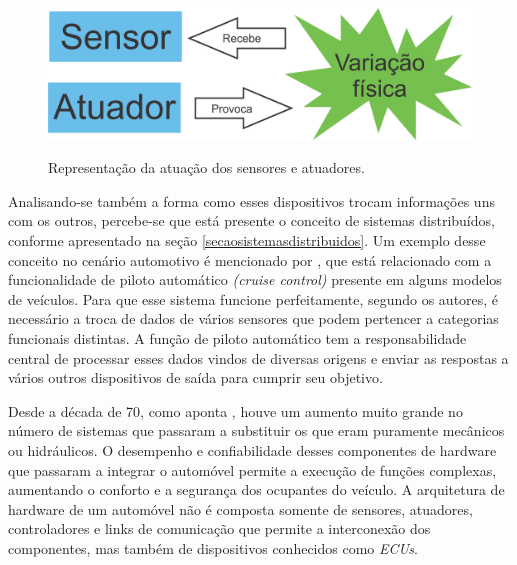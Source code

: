 \begin{figure}[!ht]
\centering
\caption{Representação da atuação dos sensores e atuadores.} 
{\includegraphics[scale=.29]{imagens/relacaoSensorAtuador.png}}\\
 \label{Fig:relacao_sensor_atuador}
\end{figure}

Analisando-se também a forma como esses dispositivos trocam informações uns com os outros, percebe-se que está presente o conceito de sistemas distribuídos, conforme apresentado na seção \ref{secaosistemasdistribuidos}. Um exemplo desse conceito no cenário automotivo é mencionado por , que está relacionado com a funcionalidade de piloto automático \textit{(cruise control)} presente em alguns modelos de veículos. Para que esse sistema funcione perfeitamente, segundo os autores, é necessário a troca de dados de vários sensores que podem pertencer a categorias funcionais distintas. A função de piloto automático tem a responsabilidade central de processar esses dados vindos de diversas origens e enviar as respostas a vários outros dispositivos de saída para cumprir seu objetivo.

Desde a década de 70, como aponta , houve um aumento muito grande no número de sistemas que passaram a substituir os que eram puramente mecânicos ou hidráulicos. O desempenho e confiabilidade desses componentes de hardware que passaram a integrar o automóvel permite a execução de funções complexas, aumentando o conforto e a segurança dos ocupantes do veículo. A arquitetura de hardware de um automóvel não é composta somente de sensores, atuadores, controladores e links de comunicação que permite a interconexão dos componentes, mas também de dispositivos conhecidos como \textit{ECUs}.

